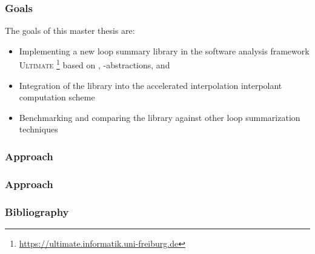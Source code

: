 \documentclass[%
10pt,
dvipsnames,
]{beamer}
\begin{document}

\begin{frame}[t]
	\frametitle{Goals}
	The goals of this master thesis are:
	\begin{itemize}
		\item Implementing a new loop summary library in the software analysis framework \textsc{Ultimate} \footnote{\url{https://ultimate.informatik.uni-freiburg.de}} based on \qvasr, \qvasr-abstractions, and \qvasrs
		\item Integration of the library into the accelerated interpolation interpolant computation scheme
		\item Benchmarking and comparing the library against other loop summarization techniques
	\end{itemize}
\end{frame}

\begin{frame}[t]
	\frametitle{Approach}
	\resizebox{11cm}{!}{}
\end{frame}


\begin{frame}[t]
	\frametitle{Approach}
	\resizebox{11cm}{!}{}
\end{frame}

\begin{frame}
	\label{slide:bibliography}
	\frametitle{Bibliography}
	\fontsize{10}{10}\selectfont
	
	\nocite{DBLP:conf/cav/SilvermanK19} \nocite{DBLP:conf/cav/SilvermanK19}
	
\end{frame}
\end{document}
